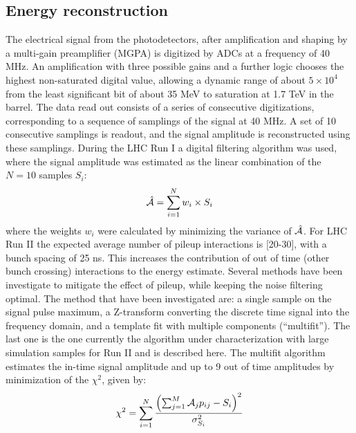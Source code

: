 \documentclass[journal]{IEEEtran}
\begin{document}
\subsection{Energy reconstruction}

The electrical signal from the photodetectors, after amplification and shaping by a multi-gain preamplifier (MGPA) is digitized by ADCs at a frequency of 40 MHz. An amplification with three possible gains and a further logic chooses the highest non-saturated digital value, allowing a dynamic range of about $5 \times 10^4$ from the least significant bit of about 35 MeV to saturation at 1.7 TeV in the barrel.
The data read out consists of a series of consecutive digitizations, corresponding to a sequence of samplings of the signal at 40 MHz. A set of 10 consecutive samplings is readout, and the signal amplitude is reconstructed using these samplings. During the LHC Run I a digital filtering algorithm was used, where the signal amplitude was estimated as the linear combination of the $N=10$ samples $S_i$:
\begin{equation}
\hat{\cal A}=\sum_{i=1}^{N} w_i \times S_i
\end{equation}
where the weights $w_i$ were calculated by minimizing the variance of $\hat{\cal A}$. 
For LHC Run II the expected average number of pileup interactions is [20-30], with a bunch spacing of 25 ns. This increases the contribution of out of time (other bunch crossing) interactions to the energy estimate. Several methods have been investigate to mitigate the effect of pileup, while keeping the noise filtering optimal. The method that have been investigated are: a single sample on the signal pulse maximum, a Z-transform converting the discrete time signal into the frequency domain, and a template fit with multiple components (``multifit''). The last one is the one currently the algorithm under characterization with large simulation samples for Run II and is described here.
The multifit algorithm estimates the in-time signal amplitude and up to 9 out of time amplitudes by minimization of the $\chi^2$, given by:
\begin{equation}
\chi^2 = \sum_{i=1}^{N} \frac{\left(\sum_{j=1}^M {\cal A}_{j}p_{ij} - S_i \right)^2}{\sigma^2_{S_i}}
\end{equation}
\end{document}
